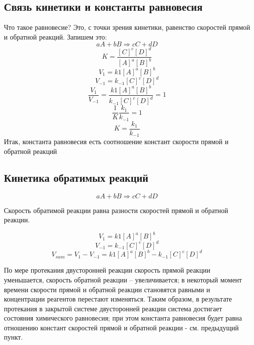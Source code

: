 \documentclass[14pt,a4paper]{scrartcl}
\begin{document}
\subsection*{Связь кинетики и константы равновесия}

Что такое равновесие? Это, с точки зрения кинетики, равенство скоростей прямой и обратной реакций. Запишем это:
$$aA + bB \Rightarrow cC + dD$$
$$K =\frac{\left[C\right]^c\left[D\right]^d}{\left[A\right]^a\left[B\right]^b}$$
$$V_1 = k1 \left[A\right]^a\left[B\right]^b$$
$$V_{-1} = k_{-1}\left[C\right]^c\left[D\right]^d$$
$$\frac{V_1}{V_{-1}} = \frac{k1 \left[A\right]^a\left[B\right]^b}{k_{-1}\left[C\right]^c\left[D\right]^d} = 1$$
$$\frac 1K\frac{k_1}{k_{-1}} = 1$$
$$K = \frac{k_1}{k_{-1}}$$
Итак, константа равновесия есть соотношение констант скорости прямой и обратной реакций

\subsection*{Кинетика обратимых реакций}

$$aA + bB \Rightarrow cC + dD$$

Скорость обратимой реакции равна разности скоростей прямой и обратной реакции.

$$V_1 = k1 \left[A\right]^a\left[B\right]^b$$
$$V_{-1} = k_{-1}\left[C\right]^c\left[D\right]^d$$
$$V_{sum} = V_1 - V_{-1} = k1 \left[A\right]^a\left[B\right]^b - k_{-1}\left[C\right]^c\left[D\right]^d$$

По мере протекания двусторонней реакции скорость прямой реакции уменьшается, скорость обратной реакции – увеличивается; в некоторый момент времени скорости прямой и обратной реакции становятся равными и концентрации реагентов перестают изменяться. Таким образом, в результате протекания в закрытой системе двусторонней реакции система достигает состояния химического равновесия; при этом константа равновесия будет равна отношению констант скоростей прямой и обратной реакции - см. предыдущий пункт.
\end{document}
